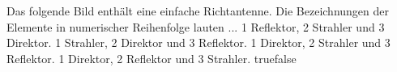     {Das folgende Bild enthält eine einfache Richtantenne. Die Bezeichnungen der Elemente in numerischer Reihenfolge lauten ...}
    {1 Reflektor, 2 Strahler und 3 Direktor.}
    {1 Strahler, 2 Direktor und 3 Reflektor.}
    {1 Direktor, 2 Strahler und 3 Reflektor.}
    {1 Direktor, 2 Reflektor und 3 Strahler.}
    {true}{false}